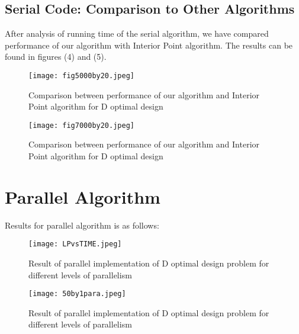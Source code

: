 \documentclass[11pt, oneside]{article}
\begin{document}
\subsection{Serial Code: Comparison to Other Algorithms}
After analysis of running time of the serial algorithm, we have compared performance of our algorithm with Interior Point algorithm. The results can be found in figures (4) and (5). 
 \begin{figure}[h!]
    \texttt{[image: fig5000by20.jpeg]}
    \caption{Comparison between performance of our algorithm and Interior Point algorithm for D optimal design}
    \label{fig:f1}
    \end{figure}    
 \begin{figure}[h!]
    \texttt{[image: fig7000by20.jpeg]}
    \caption{Comparison between performance of our algorithm and Interior Point algorithm for D optimal design}
    \label{fig:f1}
    \end{figure}
\section{Parallel Algorithm}
Results for parallel algorithm is as follows:
 \begin{figure}[h!]
    \texttt{[image: LPvsTIME.jpeg]}
    \caption{Result of parallel implementation of D optimal design problem for different levels of parallelism}
    \label{fig:f1}
    \end{figure}    
 \begin{figure}[h!]
    \texttt{[image: 50by1para.jpeg]}
    \caption{Result of parallel implementation of D optimal design problem for different levels of parallelism}
    \label{fig:f1}
    \end{figure} 


 






\end{document}
